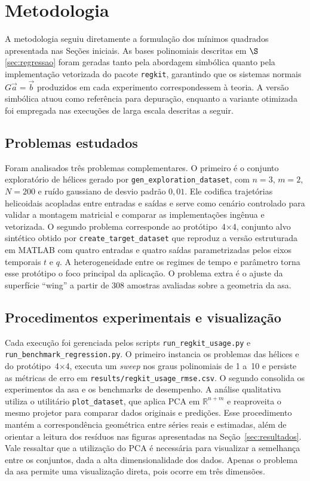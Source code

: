 \section{Metodologia}
\label{sec:metodologia}

A metodologia seguiu diretamente a formulação dos mínimos quadrados apresentada
nas Seções iniciais. As bases polinomiais descritas em $\S$\ref{sec:regressao}
foram geradas tanto pela abordagem simbólica quanto pela implementação
vetorizada do pacote \texttt{regkit}, garantindo que os sistemas normais
$G\vec{a}=\vec{b}$ produzidos em cada experimento correspondessem à teoria. A
versão simbólica atuou como referência para depuração, enquanto a variante
otimizada foi empregada nas execuções de larga escala descritas a seguir.

\subsection{Problemas estudados}

Foram analisados três problemas complementares. O primeiro é o conjunto
exploratório de hélices gerado por \texttt{gen\_exploration\_dataset}, com
$n=3$, $m=2$, $N=200$ e ruído gaussiano de desvio padrão $0{,}01$. Ele codifica
trajetórias helicoidais acopladas entre entradas e saídas e serve como cenário
controlado para validar a montagem matricial e comparar as implementações
ingênua e vetorizada. O segundo problema corresponde ao protótipo~4$\times$4,
conjunto alvo sintético obtido por \texttt{create\_target\_dataset} que
reproduz a versão estruturada em MATLAB com quatro entradas e quatro saídas
parametrizadas pelos eixos temporais $t$ e $q$. A heterogeneidade entre os
regimes de tempo e parâmetro torna esse protótipo o foco principal da aplicação.
O problema extra é o ajuste da superfície ``wing'' a partir de 308 amostras
avaliadas sobre a geometria da asa. 

\subsection{Procedimentos experimentais e visualização}

Cada execução foi gerenciada pelos scripts \texttt{run\_regkit\_usage.py} e
\texttt{run\_benchmark\_regression.py}. O primeiro instancia os problemas das
hélices e do protótipo~4$\times$4, executa um \textit{sweep} nos graus polinomiais de
1 a~10 e persiste as métricas de erro em \texttt{results/regkit\_usage\_rmse.csv}.
O segundo consolida os experimentos da asa e os benchmarks de desempenho. A
análise qualitativa utiliza o utilitário \texttt{plot\_dataset}, que aplica PCA
em $\mathbb{R}^{n+m}$ e reaproveita o mesmo projetor para comparar dados
originais e predições. Esse procedimento mantém a
correspondência geométrica entre séries reais e estimadas, além de orientar a
leitura dos resíduos nas figuras apresentadas na Seção~\ref{sec:resultados}. 
Vale ressaltar que a utilização do PCA é necessária para visualizar a semelhança 
entre os conjuntos, dada a alta dimensionalidade dos dados. Apenas o problema da asa
permite uma visualização direta, pois ocorre em três dimensões. 
